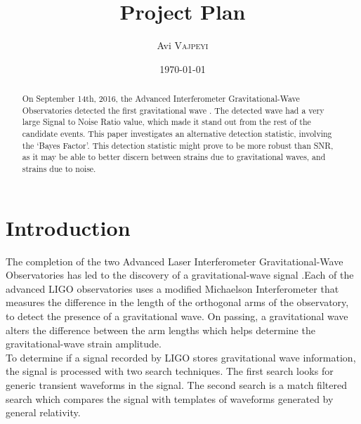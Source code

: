 \documentclass{article}
\title{Project Plan} %
\author{Avi \textsc{Vajpeyi}} %
\date{\today} %
\begin{document}
\maketitle %






 \begin{abstract}
On September 14th, 2016, the Advanced Interferometer Gravitational-Wave Observatories detected the first gravitational wave \cite{DetectionPaper}. The detected wave had a very large Signal to Noise Ratio value, which made it stand out from the rest of the candidate events. This paper investigates an alternative detection statistic, involving the `Bayes Factor'. This detection statistic might prove to be more robust than SNR, as it may be able to better discern between strains due to gravitational waves, and strains due to noise. 
\end{abstract}


\section{Introduction}

 \indent The completion of the two Advanced Laser Interferometer Gravitational-Wave Observatories has led to the discovery of a gravitational-wave signal \cite{DetectionPaper}.Each of the advanced LIGO observatories uses a modified Michaelson Interferometer that measures the difference in the length of the orthogonal arms of the observatory, to detect the presence of a gravitational wave. On passing, a gravitational wave alters the difference between the arm lengths which helps determine the gravitational-wave strain amplitude. \\
  
  \indent To determine if a signal recorded by LIGO stores gravitational wave information, the signal is processed with two search techniques. The first search looks for generic transient waveforms in the signal. The second search is a match filtered search which compares the signal with templates of waveforms generated by general relativity.\\
  
\end{document}
